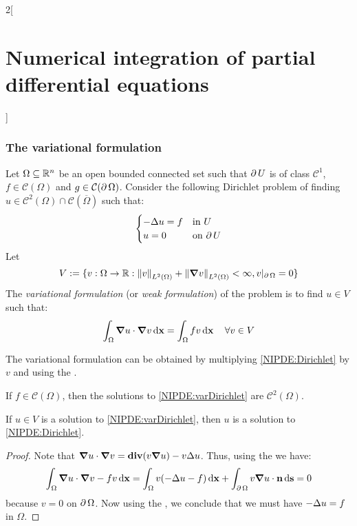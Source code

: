 \documentclass[../../../main_math.tex]{subfiles}
\begin{document}
\begin{multicols}{2}[\section{Numerical integration of partial differential equations}]
  \subsubsection{The variational formulation}
  \begin{definition}
    Let $\Omega\subseteq \mathbb{R}^n$ be an open bounded connected set such that $\operatorname{\partial}{U}$ is of class $\mathcal{C}^1$, $f\in\mathcal{C}(\Omega)$ and $g\in\mathcal{C}(\operatorname{\partial}{\Omega})$. Consider the following Dirichlet problem of finding $u\in\mathcal{C}^2(\Omega)\cap \mathcal{C}(\overline{\Omega})$ such that:
    \begin{equation}\label{NIPDE:Dirichlet}
      \begin{cases}
        -\Delta{u} = f & \text{in $U$}      \\
        u=0                & \text{on $\operatorname{\partial}{U}$}
      \end{cases}
    \end{equation}
    Let
    $$V:=\{v:\Omega\rightarrow\mathbb{R}:\left\|v\right\|_{L^2(\Omega)}+\left\|\grad{v}\right\|_{L^2(\Omega)}<\infty, v|_{\operatorname{\partial}{\Omega}}=0\}$$
    The \emph{variational formulation} (or \emph{weak formulation}) of the problem is to find $u\in V$ such that:
    \begin{equation}\label{NIPDE:varDirichlet}
      \int_\Omega \grad{u}\cdot\grad{v}\dd{\boldsymbol{\mathrm{x}}}=\int_\Omega fv\dd{\boldsymbol{\mathrm{x}}}\quad\forall v\in V
    \end{equation}
  \end{definition}
  \begin{remark}
    The variational formulation can be obtained by multiplying \cref{NIPDE:Dirichlet} by $v$ and using the .
  \end{remark}
  \begin{theorem}
    If $f\in \mathcal{C}(\Omega)$, then the solutions to \cref{NIPDE:varDirichlet} are $\mathcal{C}^2(\Omega)$.
  \end{theorem}
  \begin{lemma}
    If $u\in V$ is a solution to \cref{NIPDE:varDirichlet}, then $u$ is a solution to \cref{NIPDE:Dirichlet}.
  \end{lemma}
  \begin{proof}
    Note that $\grad u\cdot\grad v=\operatorname{\boldsymbol{\mathrm{div}}}(v\grad u) - v\Delta u$. Thus, using the  we have:
    $$
      \int_\Omega \grad{u}\cdot\grad{v}-fv\dd{\boldsymbol{\mathrm{x}}}=\int_\Omega v(-\Delta u-f)\dd{\boldsymbol{\mathrm{x}}}+\int_{\operatorname{\partial}{\Omega}}v\grad{u}\cdot\boldsymbol{\mathrm{n}}\dd{\boldsymbol{\mathrm{s}}}=0
    $$
    because $v=0$ on $\operatorname{\partial}{\Omega}$. Now using the , we conclude that we must have $-\Delta u=f$ in $\Omega$.

\end{proof}
\end{multicols}
\end{document}
